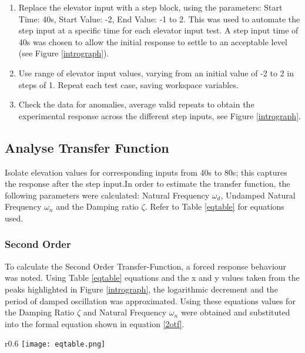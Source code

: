 \begin{enumerate}

\item
  Replace the elevator input with a step block, using the parameters:
  Start Time: 40s, Start Value: -2, End Value: -1 to 2. This was used to
  automate the step input at a specific time for each elevator input
  test. A step input time of 40s was chosen to allow the initial
  response to settle to an acceptable level (see Figure
  \ref{intrograph}).
\item
  Use range of elevator input values, varying from an initial value of
  -2 to 2 in steps of 1. Repeat each test case, saving workspace
  variables.
\item
  Check the data for anomalies, average valid repeats to obtain the
  experimental response across the different step inputs, see Figure
  \ref{intrograph}.
\end{enumerate}

\subsection{Analyse Transfer Function}\label{analyse-transfer-function}

Isolate elevation values for corresponding inputs from 40s to 80s; this
captures the response after the step input.In order to estimate the
transfer function, the following parameters were calculated: Natural
Frequency \(\omega_d\), Undamped Natural Frequency \(\omega_n\) and the
Damping ratio \(\zeta\). Refer to Table \ref{eqtable} for equations
used.

\subsubsection{Second Order}\label{second-order}

To calculate the Second Order Transfer-Function, a forced response
behaviour was noted. Using Table \ref{eqtable} equations and the x and y
values taken from the peaks highlighted in Figure \ref{intrograph}, the
logarithmic decrement and the period of damped oscillation was
approximated. Using these equations values for the Damping Ratio
\(\zeta\) and Natural Frequency \(\omega_n\) were obtained and
substituted into the formal equation shown in equation \ref{2otf}.

\begin{wrapfigure}{r}{0.6\textwidth}
\vspace{-25pt}
  \centering
  \texttt{[image: eqtable.png]}
  \label{eqtable}
\end{wrapfigure}

